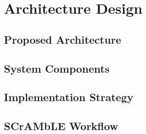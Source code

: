 \chapter{Architecture Design}
\label{ch:Architecture Design}

\section{Proposed Architecture}
\section{System Components}
\section{Implementation Strategy}
\section{SCrAMbLE Workflow}

